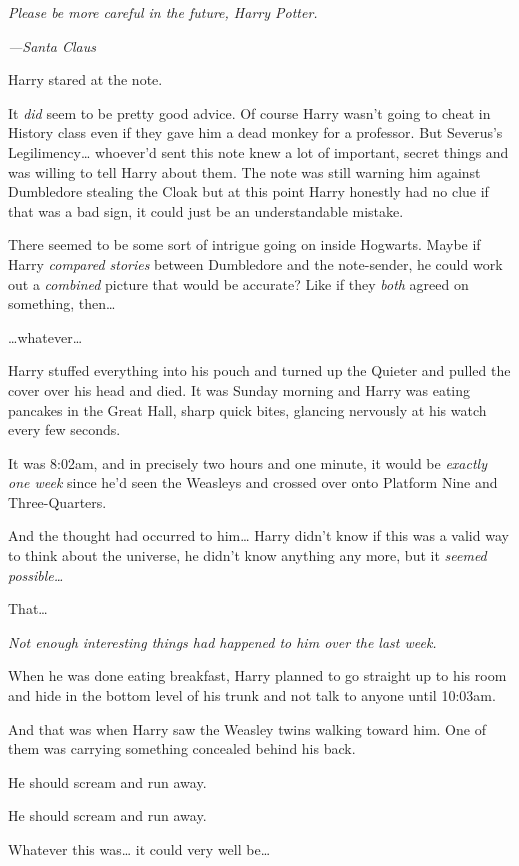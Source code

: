 \emph{Please be more careful in the future, Harry Potter.}

\emph{---Santa Claus}

Harry stared at the note.

It \emph{did} seem to be pretty good advice. Of course Harry wasn't going to 
cheat in History class even if they gave him a dead monkey for a professor. But 
Severus's Legilimency{\ldots} whoever'd sent this note knew a lot of important, 
secret things and was willing to tell Harry about them. The note was still 
warning him against Dumbledore stealing the Cloak but at this point Harry 
honestly had no clue if that was a bad sign, it could just be an understandable 
mistake.

There seemed to be some sort of intrigue going on inside Hogwarts. Maybe if 
Harry \emph{compared stories} between Dumbledore and the note-sender, he could 
work out a \emph{combined} picture that would be accurate? Like if they 
\emph{both} agreed on something, then{\ldots}

{\ldots}whatever{\ldots}

Harry stuffed everything into his pouch and turned up the Quieter and pulled 
the cover over his head and died.
\sbreak
It was Sunday morning and Harry was eating pancakes in the Great Hall, sharp 
quick bites, glancing nervously at his watch every few seconds.

It was 8:02am, and in precisely two hours and one minute, it would be 
\emph{exactly one week} since he'd seen the Weasleys and crossed over onto 
Platform Nine and Three-Quarters.

And the thought had occurred to him{\ldots} Harry didn't know if this was a 
valid way to think about the universe, he didn't know anything any more, but it 
\emph{seemed possible{\ldots}}

That{\ldots}

\emph{Not enough interesting things had happened to him over the last week.}

When he was done eating breakfast, Harry planned to go straight up to his room 
and hide in the bottom level of his trunk and not talk to anyone until 10:03am.

And that was when Harry saw the Weasley twins walking toward him. One of them 
was carrying something concealed behind his back.

He should scream and run away.

He should scream and run away.

Whatever this was{\ldots} it could very well be{\ldots}

